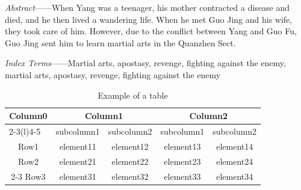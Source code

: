 

	\textit{Abstract}——When Yang was a teenager, his mother contracted a disease and died, and he then lived a wandering life. When he met Guo Jing and his wife, they took care of him. However, due to the conflict between Yang and Guo Fu, Guo Jing sent him to learn martial arts in the Quanzhen Sect.

	\textit{Index Terms}——Martial arts, apostasy, revenge, fighting against the enemy, martial arts, apostasy, revenge, fighting against the enemy


	\begin{table}[htp]
		\captionsetup{list=no}%
		\caption{Example of a table}
		\begin{tabular}{ccccc}
			\toprule
			\multirow{2}{*}{Column0} &  \multicolumn{2}{c}{Column1\tnote{1}} & \multicolumn{2}{c}{Column2\tnote{2}} \\
			\cmidrule(lr){2-3}\cmidrule(l){4-5}
			~     & subcolumn1 & subcolumn2 & subcolumn1 & subcolumn2 \\
			\midrule
			Row1  & element11 & element12 &element13 & element14 \\
			Row2  & element21 & element22 &element23 & element24 \\
			\cmidrule{2-3}\cmidrule{4-5}
			Row3  & element31 & element32 &element33 & element34 \\
			\bottomrule
		\end{tabular}
	\end{table}





